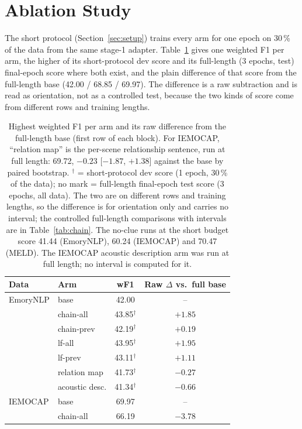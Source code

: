 \documentclass[lettersize,journal]{IEEEtran}
\begin{document}
\section{Ablation Study}
The short protocol (Section~\ref{sec:setup}) trains every arm for one epoch on 30\,\% of the data from the same stage-1 adapter. Table~\ref{tab:abl} gives one weighted F1 per arm, the higher of its short-protocol dev score and its full-length (3 epochs, test) final-epoch score where both exist, and the plain difference of that score from the full-length base (42.00 / 68.85 / 69.97). The difference is a raw subtraction and is read as orientation, not as a controlled test, because the two kinds of score come from different rows and training lengths.

\begin{table}[!t]
\caption{Highest weighted F1 per arm and its raw difference from the full-length base (first row of each block). For IEMOCAP, ``relation map'' is the per-scene relationship sentence, run at full length: 69.72, $-0.23$ [$-1.87$, $+1.38$] against the base by paired bootstrap. $^{\dagger}$ = short-protocol dev score (1 epoch, 30\,\% of the data); no mark = full-length final-epoch test score (3 epochs, all data). The two are on different rows and training lengths, so the difference is for orientation only and carries no interval; the controlled full-length comparisons with intervals are in Table~\ref{tab:chain}. The no-clue runs at the short budget score 41.44 (EmoryNLP), 60.24 (IEMOCAP) and 70.47 (MELD). The IEMOCAP acoustic description arm was run at full length; no interval is computed for it.}\label{tab:abl}
\centering\footnotesize
\begin{tabular}{llcc}
\toprule
Data & Arm & wF1 & Raw $\Delta$ vs.\ full base\\
\midrule
EmoryNLP & base & 42.00 & --\\
 & chain-all & 43.85$^{\dagger}$ & $+1.85$\\
 & chain-prev & 42.19$^{\dagger}$ & $+0.19$\\
 & lf-all & 43.95$^{\dagger}$ & $+1.95$\\
 & lf-prev & 43.11$^{\dagger}$ & $+1.11$\\
 & relation map & 41.73$^{\dagger}$ & $-0.27$\\
 & acoustic desc. & 41.34$^{\dagger}$ & $-0.66$\\
\midrule
IEMOCAP & base & 69.97 & --\\
 & chain-all & 66.19 & $-3.78$\\

\end{tabular}
\end{table}
\end{document}
